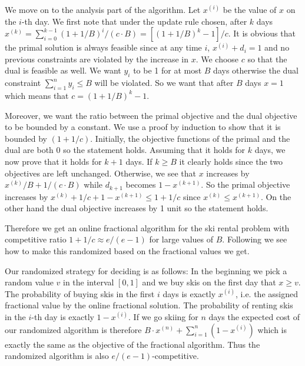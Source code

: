 We move on to the analysis part of the algorithm. Let $x^{(i)}$ be the value of $x$ on the $i$-th day. We first note that under the update rule chosen, after $k$ days $x^{(k)} =  \sum_{i=0}^{k-1} (1+1/B)^i / (c\cdot B) = [(1+1/B)^k-1]/c$. It is obvious that the primal solution is always feasible since at any time $i$, $x^{(i)}+d_i=1$ and no previous constraints are violated by the increase in $x$. We choose $c$ so that the dual is feasible as well. We want $y_i$ to be 1 for at most $B$ days otherwise the dual constraint  $\sum^n_{i=1} y_i \le B$ will be violated. So we want that after $B$ days $x = 1$ which means that $c = (1+1/B)^k-1$.

Moreover, we want the ratio between the primal objective and the dual objective to be bounded by a constant.
We use a proof by induction to show that it is bounded by $(1+1/c)$.
Initially, the objective functions of the primal and the dual are both 0 so the statement holds.
Assuming that it holds for $k$ days, we now prove that it holds for $k+1$ days.
If $k\ge B$ it clearly holds since the two objectives are left unchanged.
Otherwise, we see that $x$ increases by $x^{(k)} / B + 1/(c \cdot B)$ while $d_{k+1}$ becomes $1 - x^{(k+1)}$.
So the primal objective increases by $x^{(k)} + 1/c + 1 - x^{(k+1)} \le 1 + 1/c$ since $x^{(k)} \le x^{(k+1)}$.
On the other hand the dual objective increases by 1 unit so the statement holds.

Therefore we get an online fractional algorithm for the ski rental problem with competitive ratio $1+1/c \approx e/(e-1)$ for large values of $B$.
Following we see how to make this randomized based on the fractional values we get.

Our randomized strategy for deciding is as follows: In the beginning we pick a random value $v$ in the interval $[0,1]$ and we buy skis on the first day that $x \ge v$.
The probability of buying skis in the first $i$ days is exactly $x^{(i)}$, i.e. the assigned fractional value by the online fractional solution. The probability of renting skis in the $i$-th day is exactly $1-x^{(i)}$.
If we go skiing for $n$ days the expected cost of our randomized algorithm is therefore $B \cdot  x^{(n)} + \sum_{i=1}^n(1-x^{(i)})$ which is exactly the same as the objective of the fractional algorithm.
Thus the randomized algorithm is also $e/(e-1)$-competitive.

